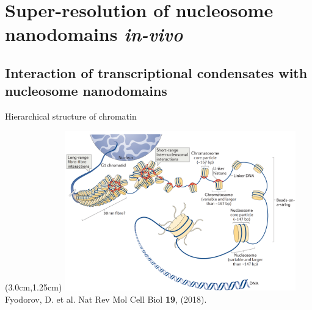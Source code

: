 \documentclass{beamer}					%
\begin{document}
\section{Super-resolution of nucleosome nanodomains \textit{in-vivo}}

\subsection{Interaction of transcriptional condensates with nucleosome nanodomains}

\begin{frame}{Hierarchical structure of chromatin}

\begin{textblock*}{10cm}(3.0cm,1.25cm)
\includegraphics[width=10cm]{../../dissertation/dissertation/media/Chromatin}
\\
\vspace{0.4cm}
Fyodorov, D. et al. Nat Rev Mol Cell Biol \textbf{19}, (2018).
\end{textblock*}

\end{frame}
\end{document}
